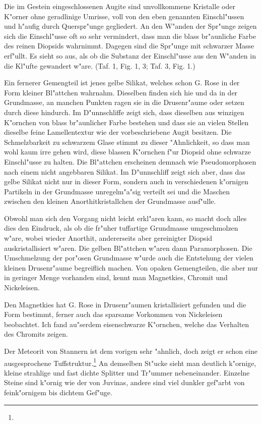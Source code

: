 \documentclass[a4paper, 11pt, oneside, polutonikogreek, german]{article}
\begin{document}
Die im Gestein eingeschlossenen Augite sind unvollkommene Kristalle oder K"orner ohne geradlinige Umrisse, voll von den eben genannten Einschl"ussen und h"aufig durch Querspr"unge gegliedert. An den W"anden der Spr"unge zeigen sich die Einschl"usse oft so sehr vermindert, dass man die blass br"aunliche Farbe des reinen Diopsids wahrnimmt. Dagegen sind die Spr"unge mit schwarzer Masse erf"ullt. Es sieht so aus, als ob die Substanz der Einschl"usse aus den W"anden in die Kl"ufte gewandert w"are. (Taf. 1, Fig. 1, 3; Taf. 3, Fig. 1.)

Ein fernerer Gemengteil ist jenes gelbe Silikat, welches schon G. Rose in der Form kleiner Bl"attchen wahrnahm. Dieselben finden sich hie und da in der Grundmasse, an manchen Punkten ragen sie in die Drusenr"aume oder setzen durch diese hindurch. Im D"unnschliffe zeigt sich, dass dieselben aus winzigen K"ornchen von blass br"aunlicher Farbe bestehen und dass sie an vielen Stellen dieselbe feine Lamellentextur wie der vorbeschriebene Augit besitzen. Die Schmelzbarkeit zu schwarzem Glase stimmt zu dieser "Ahnlichkeit, so dass man wohl kaum irre gehen wird, diese blassen K"ornchen f"ur Diopsid ohne schwarze Einschl"usse zu halten. Die Bl"attchen erscheinen demnach wie Pseudomorphosen nach einem nicht angebbaren Silikat. Im D"unnschliff zeigt sich aber, dass das gelbe Silikat nicht nur in dieser Form, sondern auch in verschiedenen k"ornigen Partikeln in der Grundmasse unregelm"a"sig verteilt sei und die Maschen zwischen den kleinen Anorthitkristallchen der Grundmasse ausf"ulle.

Obwohl man sich den Vorgang nicht leicht erkl"aren kann, so macht doch alles dies den Eindruck, als ob die fr"uher tuffartige Grundmasse umgeschmolzen w"are, wobei wieder Anorthit, andererseits aber gereinigter Diopsid auskristallisiert w"aren. Die gelben Bl"attchen w"aren dann Paramorphosen. Die Umschmelzung der por"osen Grundmasse w"urde auch die Entstehung der vielen kleinen Drusenr"aume begreiflich machen. Von opaken Gemengteilen, die aber nur in geringer Menge vorhanden sind, kennt man Magnetkies, Chromit und Nickeleisen.

Den Magnetkies hat G. Rose in Drusenr"aumen kristallisiert gefunden und die Form bestimmt, ferner auch das sparsame Vorkommen von Nickeleisen beobachtet. Ich fand au"serdem eisenschwarze K"ornchen, welche das Verhalten des Chromits zeigen.

Der Meteorit von Stannern ist dem vorigen sehr "ahnlich, doch zeigt er schon eine ausgesprochene Tuffstruktur.\footnote{} An demselben St"ucke sieht man deutlich k"ornige, kleine strahlige und fast dichte Splitter und Tr"ummer nebeneinander. Einzelne Steine sind k"ornig wie der von Juvinas, andere sind viel dunkler gef"arbt von feink"ornigem bis dichtem Gef"uge.
\end{document}
